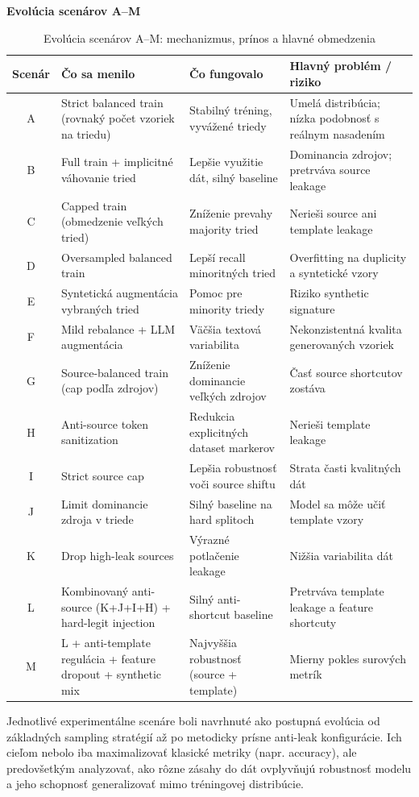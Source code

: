 \documentclass[conference]{IEEEtran}
\begin{document}
\textbf{Evolúcia scenárov A--M}
\begin{table}[!b]
\centering
\caption{Evolúcia scenárov A--M: mechanizmus, prínos a hlavné obmedzenia}
\label{tab:scenarios_a_m}
\footnotesize
\setlength{\tabcolsep}{4pt}
\renewcommand{\arraystretch}{1.1}
\begin{tabular}{|c|p{4.2cm}|p{5.2cm}|p{5.2cm}|}
\hline
\textbf{Scenár} & \textbf{Čo sa menilo} & \textbf{Čo fungovalo} & \textbf{Hlavný problém / riziko} \\
\hline
A & Strict balanced train (rovnaký počet vzoriek na triedu) & Stabilný tréning, vyvážené triedy & Umelá distribúcia; nízka podobnosť s reálnym nasadením \\
B & Full train + implicitné váhovanie tried & Lepšie využitie dát, silný baseline & Dominancia zdrojov; pretrváva source leakage \\
C & Capped train (obmedzenie veľkých tried) & Zníženie prevahy majority tried & Nerieši source ani template leakage \\
D & Oversampled balanced train & Lepší recall minoritných tried & Overfitting na duplicity a syntetické vzory \\
E & Syntetická augmentácia vybraných tried & Pomoc pre minority triedy & Riziko synthetic signature \\
F & Mild rebalance + LLM augmentácia & Väčšia textová variabilita & Nekonzistentná kvalita generovaných vzoriek \\
G & Source-balanced train (cap podľa zdrojov) & Zníženie dominancie veľkých zdrojov & Časť source shortcutov zostáva \\
H & Anti-source token sanitization & Redukcia explicitných dataset markerov & Nerieši template leakage \\
I & Strict source cap & Lepšia robustnosť voči source shiftu & Strata časti kvalitných dát \\
J & Limit dominancie zdroja v triede & Silný baseline na hard splitoch & Model sa môže učiť template vzory \\
K & Drop high-leak sources & Výrazné potlačenie leakage & Nižšia variabilita dát \\
L & Kombinovaný anti-source (K+J+I+H) + hard-legit injection & Silný anti-shortcut baseline & Pretrváva template leakage a feature shortcuty \\
M & L + anti-template regulácia + feature dropout + synthetic mix & Najvyššia robustnosť (source + template) & Mierny pokles surových metrík \\
\hline
\end{tabular}
\end{table}
Jednotlivé experimentálne scenáre boli navrhnuté ako postupná evolúcia od základných sampling stratégií až po metodicky prísne anti-leak konfigurácie. Ich cieľom nebolo iba maximalizovať klasické metriky (napr. accuracy), ale predovšetkým analyzovať, ako rôzne zásahy do dát ovplyvňujú robustnosť modelu a jeho schopnosť generalizovať mimo tréningovej distribúcie.
\end{document}
